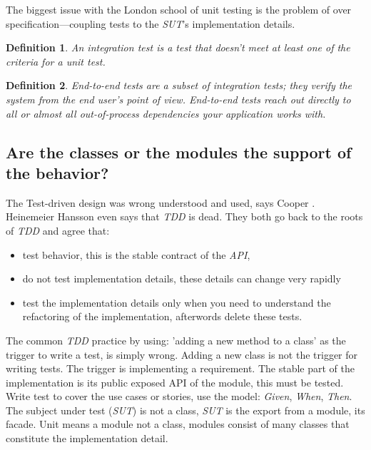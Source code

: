 \documentclass{article}
\newtheorem{definition}{Definition}
\begin{document}
The biggest issue with the London school of unit testing is the problem of over specification—coupling tests to the \textit{SUT}’s implementation details.

\begin{definition}
An integration test is a test that doesn’t meet at least one of the criteria for a unit test. 
\end{definition}

\begin{definition}
End-to-end tests are a subset of integration tests; they verify the system from the end user’s point of view. End-to-end tests reach out directly to all or almost all out-of-process dependencies your application works with.
\end{definition}


\subsection{Are the classes or the modules the support of the behavior?}

The Test-driven design \cite{beck2002driven} was wrong understood and used, says Cooper \cite{WEBSITE:WhereDidItAllGoWrong}. Heinemeier Hansson \cite{WEBSITE:TDDisdead} even says that \textit{TDD} is dead. They both go back to the roots of \textit{TDD} and agree that: 

\begin{itemize}
	\item test behavior, this is the stable contract of the \textit{API}, 
	\item do not test implementation details, these details can change very rapidly
	\item test the implementation details only when you need to understand the refactoring of the implementation, afterwords delete these tests.
\end{itemize}

The common \textit{TDD} practice by using: 'adding a new method to a class' as the trigger to write a test, is simply wrong. Adding a new class is not the trigger for writing tests. The trigger is implementing a requirement.
The stable part of the implementation is its public exposed API of the module, this must be tested. Write test to cover the use cases or stories, use the model: \textit{Given}, \textit{When}, \textit{Then}. The subject under test (\textit{SUT}) is not a class, \textit{SUT} is the export from a module, its facade.
Unit means a module not a class, modules consist of many classes that constitute the implementation detail.
\end{document}
